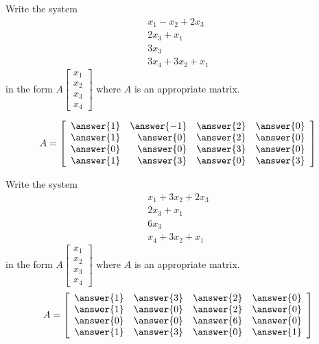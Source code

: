 \documentclass{ximera}
\begin{document}
\begin{problem}\label{prb:4.21} Write the system
\begin{equation*}
\begin{array}{c}
x_{1}-x_{2}+2x_{3} \\
2x_{3}+x_{1} \\
3x_{3} \\
3x_{4}+3x_{2}+x_{1}
\end{array}
\end{equation*}
 in the form $A\left[
\begin{array}{c}
x_{1} \\
x_{2} \\
x_{3} \\
x_{4}
\end{array}
\right] $ where $A$ is an appropriate matrix.

$$A=\left[
\begin{array}{rrrr}
\answer{1} & \answer{-1} & \answer{2} & \answer{0} \\
\answer{1} & \answer{0} & \answer{2} & \answer{0} \\
\answer{0} & \answer{0} & \answer{3} & \answer{0} \\
\answer{1} & \answer{3} & \answer{0} & \answer{3}
\end{array}
\right] $$

\end{problem}

\begin{problem}\label{prb:4.22} Write the system
\begin{equation*}
\begin{array}{c}
x_{1}+3x_{2}+2x_{3} \\
2x_{3}+x_{1} \\
6x_{3} \\
x_{4}+3x_{2}+x_{1}
\end{array}
\end{equation*}
 in the form $A\left[
\begin{array}{c}
x_{1} \\
x_{2} \\
x_{3} \\
x_{4}
\end{array}
\right] $ where $A$ is an appropriate matrix.
$$A=\left[
\begin{array}{rrrr}
\answer{1} & \answer{3} & \answer{2} & \answer{0} \\
\answer{1} & \answer{0} & \answer{2} & \answer{0} \\
\answer{0} & \answer{0} & \answer{6} & \answer{0} \\
\answer{1} & \answer{3} & \answer{0} & \answer{1}
\end{array}
\right] $$
\end{problem}
\end{document}
